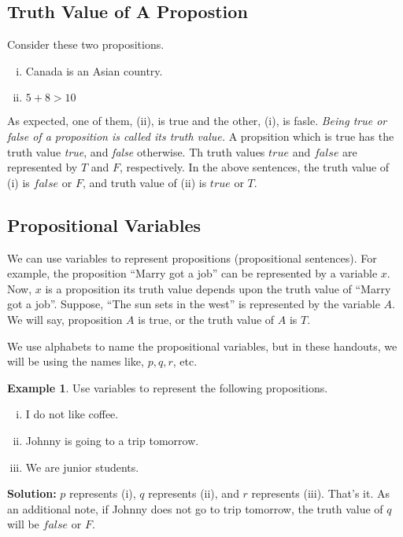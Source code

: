 \documentclass[a4paper]{article}
\theoremstyle{definition}
\newtheorem{example}{Example}
\theoremstyle{definition}
\theoremstyle{definition}
\theoremstyle{definition}
\theoremstyle{definition}
\theoremstyle{definition}
\theoremstyle{definition}
\begin{document}
\subsection{Truth Value of A Propostion}
Consider these two propositions.
\begin{enumerate}[i.]
    \item Canada is an Asian country.
    \item $ 5 + 8 > 10 $
\end{enumerate}
As expected, one of them, (ii), is true and the other, (i), is fasle. \textit{Being true or false of a proposition is called its truth value.} A propsition which is true has the truth value \textit{true}, and \textit{false} otherwise. Th truth values $true$ and $false$ are represented by $T$ and $F$, respectively. In the above sentences, the truth value of (i) is $false$ or $F$, and truth value of (ii) is $true$ or $T$.

\subsection{Propositional Variables}
We can use variables to represent propositions (propositional sentences). For example, the proposition ``Marry got a job'' can be represented by a variable $x$. Now, $x$ is a proposition its truth value depends upon the truth value of ``Marry got a job''. Suppose, ``The sun sets in the west'' is represented by the variable $A$. We will say, proposition $A$ is true, or the truth value of $A$ is $T$.

We use alphabets to name the propositional variables, but in these handouts, we will be using the names like, $p, q, r$, etc.

\begin{example}
    Use variables to represent the following propositions.
    \begin{enumerate}[i.]
        \item I do not like coffee.
        \item Johnny is going to a trip tomorrow.
        \item We are junior students.
    \end{enumerate}
    \textbf{Solution:} $p$ represents (i), $q$ represents (ii), and $r$ represents (iii). That's it. As an additional note, if Johnny does not go to trip tomorrow, the truth value of $q$ will be $false$ or $F$.
\end{example}
\end{document}
